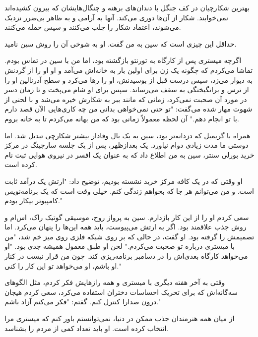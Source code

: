 بهترین شکارچیان در کف جنگل با دندان‌های برهنه و چنگال‌هایشان که بیرون کشیده‌اند نمی‌خوابند. شکار از آن‌ها دوری می‌کند. آنها به آرامی و به ظاهر بی‌ضرر نزدیک می‌شوند، اعتماد شکار را جلب می‌کنند و سپس حمله می‌کنند.

حداقل این چیزی است که سین به من گفت. او به شوخی آن را روش سین نامید. 

اگرچه میستری پس از کارگاه به تورنتو بازگشته بود، اما من با سین در تماس بودم. تماشا می‌کردم که چگونه یک زن برای اولین بار به خانه‌اش می‌آمد و او او را از گردنش به دیوار می‌زد، سپس درست قبل از بوسیدنش، او را رها می‌کرد و سطح آدرنالین او را از ترس و برانگیختگی به سقف می‌رساند. سپس برای او شام می‌پخت و تا زمان دسر در مورد آن صحبت نمی‌کرد، زمانی که مانند ببر به شکارش خیره می‌شد و با لحنی از شهوت مهار شده می‌گفت: "تو حتی نمی‌خواهی بدانی من چه کاری‌هایی الآن قصد دارم با تو انجام دهم." آن لحظه معمولاً زمانی بود که من بهانه می‌کردم تا به خانه بروم.

همراه با گریمبل که دزدانه‌تر بود، سین به یک بال وفادار بیشتر شکارچی تبدیل شد. اما دوستی ما مدت زیادی دوام نیاورد. یک بعدازظهر، پس از یک جلسه سارجینگ در مرکز خرید بورلی سنتر، سین به من اطلاع داد که به عنوان یک افسر در نیروی هوایی ثبت نام کرده است.

او وقتی که در یک کافه مرکز خرید نشسته بودیم، توضیح داد: "ارتش یک درآمد ثابت است. و من می‌توانم هر جا که بخواهم زندگی کنم. خیلی وقت است که یک برنامه‌نویس کامپیوتر بیکار بودم."

سعی کردم او را از این کار بازدارم. سین به پرواز روح، موسیقی گوتیک راک، اس‌ام و روش جذب علاقمند بود. اگر به ارتش می‌پیوست، باید همه این‌ها را پنهان می‌کرد. اما تصمیمش را گرفته بود. او گفت، در حالی که بر روی شبکه فلزی روی میز خم شد، "من با میستری درباره تو صحبت می‌کردم." لحن او طبق معمول همیشه جدی بود. "او می‌خواهد کارگاه بعدی‌اش را در دسامبر برنامه‌ریزی کند. چون من قرار نیست در کنار او باشم، او می‌خواهد تو این کار را کنی."

وقتی به آخر هفته دیگری با میستری و همه رازهایش فکر کردم، مثل الگوهای سه‌گانه‌اش که برای تحریک احساسات دختران استفاده می‌کرد، سعی کردم هیجان درون صدارا کنترل کنم. گفتم: "فکر می‌کنم آزاد باشم."

از میان همه هنرمندان جذب ممکن در دنیا، نمی‌توانستم باور کنم که میستری مرا انتخاب کرده است. او باید تعداد کمی از مردم را بشناسد.